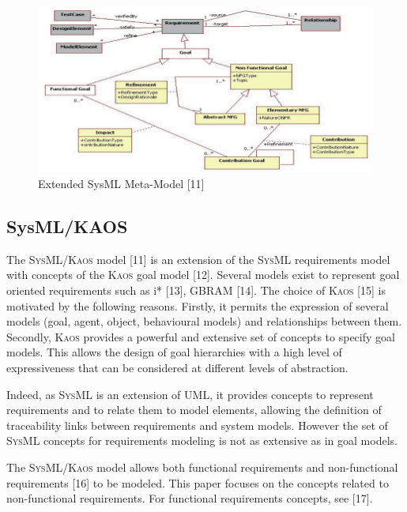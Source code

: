 \documentclass[10pt, conference, compsocconf]{IEEEtran}
\def\sysml{\textsc{SysML}}
\def\kaos{\textsc{Kaos}}
\begin{document}
\begin{figure}[!t]
\centering
\includegraphics[width=5.5in]{fig5}
\caption{Extended SysML Meta-Model [11]}
\label{fig:meta}
\end{figure}

\subsection{SysML/KAOS}

%

The \sysml{}/\kaos{} model [11] is an extension of the \sysml{} requirements model with concepts of the \kaos{} goal model [12]. Several models exist to represent goal oriented requirements such as i* [13], GBRAM [14]. The choice of \kaos{} [15] is motivated by the following reasons. Firstly, it permits the expression of several models (goal, agent, object, behavioural models) and relationships between them. Secondly, \kaos{} provides a powerful and extensive set of concepts to specify goal models. This allows the design of goal hierarchies with a high level of expressiveness that can be considered at different levels of abstraction.

Indeed, as \sysml{} is an extension of UML, it provides concepts to represent requirements and to relate them to model elements, allowing the definition of traceability links between requirements and system models. However the set of \sysml{} concepts for requirements modeling is not as extensive as in goal models. 

The \sysml{}/\kaos{} model allows both functional requirements and non-functional requirements [16] to be modeled. This paper focuses on the concepts related to non-functional requirements. For functional requirements concepts, see [17].
\end{document}
